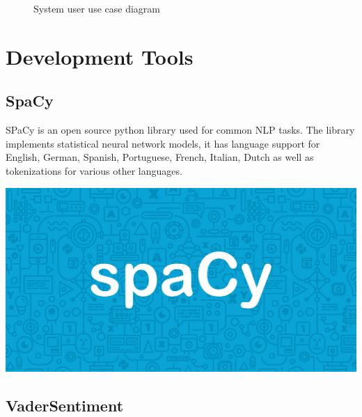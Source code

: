 \begin{figure}[h]
  \centering
  \caption[System user use case diagram]%
  {System user use case diagram}
  \label{fig:ALAP:sm1}
\end{figure}



\section{Development Tools}

\subsection{SpaCy}

\begin{minipage}{0.68\textwidth}
SPaCy is an open source python library used for common NLP tasks. The library implements statistical neural network models, it has language support for English, German, Spanish, Portuguese, French, Italian, Dutch as well as tokenizations for various other languages.
\end{minipage}%
%
\begin{minipage}{0.3\textwidth}
  \hspace*{.4cm}
  \includegraphics[width=\textwidth]{images/spacy_logo}
\end{minipage}




\subsection{VaderSentiment}

